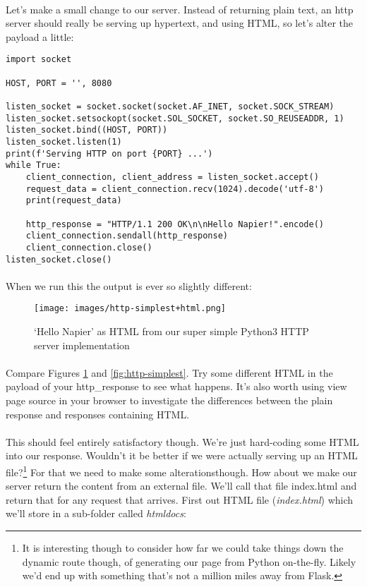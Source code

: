 \paragraph{} Let's make a small change to our server. Instead of returning plain text, an http server should really be serving up hypertext, and using HTML, so let's alter the payload a little:

\begin{lstlisting}
import socket

HOST, PORT = '', 8080

listen_socket = socket.socket(socket.AF_INET, socket.SOCK_STREAM)
listen_socket.setsockopt(socket.SOL_SOCKET, socket.SO_REUSEADDR, 1)
listen_socket.bind((HOST, PORT))
listen_socket.listen(1)
print(f'Serving HTTP on port {PORT} ...')
while True:
    client_connection, client_address = listen_socket.accept()
    request_data = client_connection.recv(1024).decode('utf-8')
    print(request_data)

    http_response = "HTTP/1.1 200 OK\n\nHello Napier!".encode() 
    client_connection.sendall(http_response)
    client_connection.close()
listen_socket.close()
\end{lstlisting}

\paragraph{} When we run this the output is ever so slightly different:

\begin{figure}[H]
\centering
\texttt{[image: images/http-simplest+html.png]}
\caption{`Hello Napier' as HTML from our super simple Python3 HTTP server implementation}
\label{fig:http-simplest+html}
\end{figure}

\paragraph{} Compare Figures \ref{fig:http-simplest+html} and \ref{fig:http-simplest}. Try some different HTML in the payload of your http\_response to see what happens. It's also worth using view page source in your browser to investigate the differences between the plain response and responses containing HTML.

\paragraph{} This should feel entirely satisfactory though. We're just hard-coding some HTML into our response. Wouldn't it be better if we were actually serving up an HTML file?\footnote{It is interesting though to consider how far we could take things down the dynamic route though, of generating our page from Python on-the-fly. Likely we'd end up with something that's not a million miles away from Flask.} For that we need to make some alterationsthough. How about we make our server return the content from an external file. We'll call that file index.html and return that for any request that arrives. First out HTML file (\emph{index.html}) which we'll store in a sub-folder called \emph{htmldocs}:

